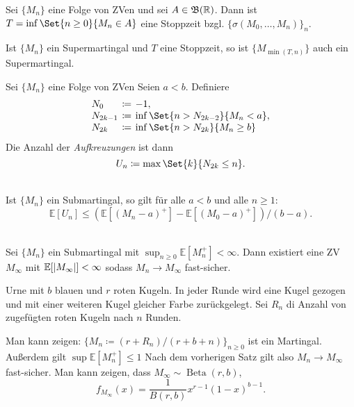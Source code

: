 \documentclass{cheat-sheet}
\newcommand{\E}{\mathbb{E}} %
\newcommand{\Bor}{\mathfrak{B}} %
\DeclareMathOperator{\Beta}{Beta} %
\begin{document}
\begin{bsp}
  Sei $\{ M_n \}$ eine Folge von ZVen und sei $A \in \Bor(\R)$.
  Dann ist $T = \inf \Set{n \geq 0}{M_n \in A}$ eine Stoppzeit bzgl. $\{ \sigma(M_0, \ldots, M_n) \}_n$.
\end{bsp}

\begin{satz}
  Ist $\{ M_n \}$ ein Supermartingal und $T$ eine Stoppzeit, so ist $\{ M_{\min(T, n)} \}$ auch ein Supermartingal.
\end{satz}



Sei $\{ M_n \}$ eine Folge von ZVen
Seien $a < b$.
Definiere
\[
  \arraycolsep=2pt
  \begin{array}{l c l}
    N_0 &\coloneqq& -1, \\
    N_{2k-1} &\coloneqq& \inf \Set{n > N_{2k-2}}{M_n < a}, \\
    N_{2k} &\coloneqq& \inf \Set{n > N_{2k}}{M_n \geq b}
  \end{array}
\]
Die Anzahl der \textit{Aufkreuzungen} ist dann
\[
  U_n \coloneqq \max \Set{k}{N_{2k} \leq n}.
\]

\begin{satz} \mbox{}\\
  Ist $\{ M_n \}$ ein Submartingal, so gilt für alle $a < b$ und alle $n \geq 1$:
  \[ \E[ U_n ] \leq (\E[ (M_n - a)^{+} ] - \E[ (M_0 - a)^{+} ]) / (b - a). \]
\end{satz}

\begin{satz} \mbox{}\\
  Sei $\{ M_n \}$ ein Submartingal mit ${\sup}_{n \geq 0} \E [ M_n^{+} ] < \infty$.
  Dann existiert eine ZV $M_\infty$ mit $\E[ \abs{M_\infty} ] < \infty$ sodass $M_n \to M_\infty$ fast-sicher.
\end{satz}

\begin{bsp}
  Urne mit $b$ blauen und $r$ roten Kugeln.
  In jeder Runde wird eine Kugel gezogen und mit einer weiteren Kugel gleicher Farbe zurückgelegt.
  Sei $R_n$ di Anzahl von zugefügten roten Kugeln nach $n$ Runden.

  Man kann zeigen: $\{ M_n \coloneqq (r + R_n) / (r + b + n) \}_{n \geq 0}$ ist ein Martingal.
  Außerdem gilt $\sup \E[M_n^{+}] \leq 1$
  Nach dem vorherigen Satz gilt also $M_n \to M_\infty$ fast-sicher.
  Man kann zeigen, dass $M_\infty \sim \Beta(r, b)$,
  \[
    f_{M_\infty}(x) = \frac{1}{B(r, b)} x^{r-1} (1-x)^{b-1}.
  \]
\end{bsp}
\end{document}
